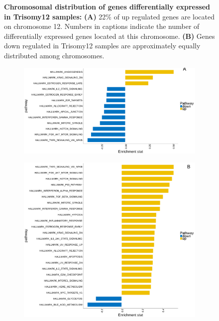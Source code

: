 \begin{figure}
\begin{subfigure}[t]{0.48\columnwidth}
		\subcaption*{}
		\label{fig:tri12_chrom_up}
	\end{subfigure}
	\caption{\textbf{Chromosomal distribution of genes differentially expressed in Trisomy12 samples:} \textbf{(A)} 22\% of up regulated genes are located on chromosome 12. Numbers in captions indicate the number of differentially expressed genes located at this chromosome. \textbf{(B)} 
		Genes down regulated in Trisomy12 samples are approximately equally distributed among chromosomes.}
	\label{fig:tri12_chrom}
\end{figure}


\begin{figure}
	\centering
	\begin{subfigure}[t]{0.48\columnwidth}
		\includegraphics[width=\columnwidth]{./Figures/gsea_IGHV.pdf}
		\subcaption*{}
		\label{fig:gsea_IGHV}
	\end{subfigure}
	\hfill
	\begin{subfigure}[t]{0.48\columnwidth}
		\includegraphics[width=\columnwidth]{./Figures/gseaHallmark_trisomy12.pdf}

\end{subfigure}
\end{figure}
